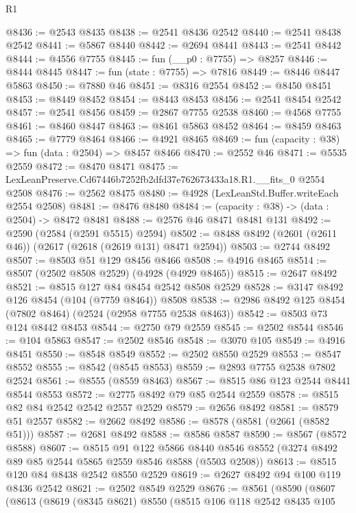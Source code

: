 \begin{lexlean}{R1}
\begin{coremodule}
@8436 := @2543 @8435
@8438 := @2541 @8436 @2542
@8440 := @2541 @8438 @2542
@8441 := @5867 @8440
@8442 := @2694 @8441
@8443 := @2541 @8442
@8444 := @4556 @7755
@8445 := fun (__p0 : @7755) => @8257
@8446 := @8444 @8445
@8447 := fun (state : @7755) => @7816
@8449 := @8446 @8447 @5863
@8450 := @7880 @46
@8451 := @8316 @2554
@8452 := @8450 @8451
@8453 := @8449 @8452
@8454 := @8443 @8453
@8456 := @2541 @8454 @2542
@8457 := @2541 @8456
@8459 := @2867 @7755 @2538
@8460 := @4568 @7755
@8461 := @8460 @8447
@8463 := @8461 @5863 @8452
@8464 := @8459 @8463
@8465 := @7779 @8464
@8466 := @4921 @8465
@8469 := fun (capacity : @38) => fun (data : @2504) => @8457 @8466
@8470 := @2552 @46
@8471 := @5535 @2559
@8472 := @8470 @8471
@8475 := LexLeanPreserve.Cd67446b7252fb2dfd37e762673433a18.R1.__fits_0 @2554 @2508
@8476 := @2562 @8475
@8480 := @4928 (LexLeanStd.Buffer.writeEach @2554 @2508)
@8481 := @8476 @8480
@8484 := (capacity : @38) -> (data : @2504) -> @8472 @8481
@8488 := @2576 @46 @8471 @8481 @131
@8492 := @2590 (@2584 (@2591 @5515) @2594)
@8502 := @8488 @8492 (@2601 (@2611 @46)) (@2617 (@2618 (@2619 @131) @8471 @2594))
@8503 := @2744 @8492
@8507 := @8503 @51 @129 @8456 @8466
@8508 := @4916 @8465
@8514 := @8507 (@2502 @8508 @2529) (@4928 (@4929 @8465))
@8515 := @2647 @8492
@8521 := @8515 @127 @84 @8454 @2542 @8508 @2529
@8528 := @3147 @8492 @126 @8454 (@104 (@7759 @8464)) @8508
@8538 := @2986 @8492 @125 @8454 (@7802 @8464) (@2524 (@2958 @7755 @2538 @8463))
@8542 := @8503 @73 @124 @8442 @8453
@8544 := @2750 @79 @2559
@8545 := @2502 @8544
@8546 := @104 @5863
@8547 := @2502 @8546
@8548 := @3070 @105
@8549 := @4916 @8451
@8550 := @8548 @8549
@8552 := @2502 @8550 @2529
@8553 := @8547 @8552
@8555 := @8542 (@8545 @8553)
@8559 := @2893 @7755 @2538 @7802 @2524
@8561 := @8555 (@8559 @8463)
@8567 := @8515 @86 @123 @2544 @8441 @8544 @8553
@8572 := @2775 @8492 @79 @85 @2544 @2559
@8578 := @8515 @82 @84 @2542 @2542 @2557 @2529
@8579 := @2656 @8492
@8581 := @8579 @51 @2557
@8582 := @2662 @8492
@8586 := @8578 (@8581 (@2661 (@8582 @51)))
@8587 := @2681 @8492
@8588 := @8586 @8587
@8590 := @8567 (@8572 @8588)
@8607 := @8515
    @91
    @122
    @5866
    @8440
    @8546
    @8552
    (@3274 @8492 @89 @85 @2544 @5865 @2559 @8546 @8588 (@5503 @2508))
@8613 := @8515 @120 @84 @8438 @2542 @8550 @2529
@8619 := @2627 @8492 @94 @100 @119 @8436 @2542
@8621 := @2502 @8549 @2529
@8676 := @8561
    (@8590
      (@8607
        (@8613
          (@8619
            (@8345 @8621)
            @8550
            (@8515
              @106
              @118
              @2542
              @8435
              @105

\end{coremodule}
\end{lexlean}
